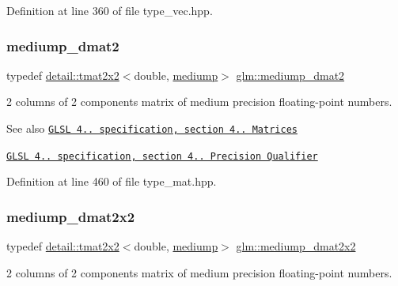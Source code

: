 Definition at line 360 of file type\+\_\+vec.\+hpp.

\mbox{\label{group__core__precision_gac056ec9d1c37e591172544088163b7e4}} 
\subsubsection{\texorpdfstring{mediump\+\_\+dmat2}{mediump\_dmat2}}
{\footnotesize\ttfamily typedef \hyperlink{structglm_1_1detail_1_1tmat2x2}{detail\+::tmat2x2}$<$double, \hyperlink{namespaceglm_a0f04f086094c747d227af4425893f545a6416f3ea0c9025fb21ed50c4d6620482}{mediump}$>$ \hyperlink{group__core__precision_gac056ec9d1c37e591172544088163b7e4}{glm\+::mediump\+\_\+dmat2}}

2 columns of 2 components matrix of medium precision floating-\/point numbers.

\begin{DoxySeeAlso}{See also}
\href{http://www.opengl.org/registry/doc/GLSLangSpec.4.20.8.pdf}{\tt G\+L\+SL 4.. specification, section 4.. Matrices} 

\href{http://www.opengl.org/registry/doc/GLSLangSpec.4.20.8.pdf}{\tt G\+L\+SL 4.. specification, section 4.. Precision Qualifier} 
\end{DoxySeeAlso}


Definition at line 460 of file type\+\_\+mat.\+hpp.

\mbox{\label{group__core__precision_ga88ddb4188060ab00fee67c9840f4417e}} 
\subsubsection{\texorpdfstring{mediump\+\_\+dmat2x2}{mediump\_dmat2x2}}
{\footnotesize\ttfamily typedef \hyperlink{structglm_1_1detail_1_1tmat2x2}{detail\+::tmat2x2}$<$double, \hyperlink{namespaceglm_a0f04f086094c747d227af4425893f545a6416f3ea0c9025fb21ed50c4d6620482}{mediump}$>$ \hyperlink{group__core__precision_ga88ddb4188060ab00fee67c9840f4417e}{glm\+::mediump\+\_\+dmat2x2}}

2 columns of 2 components matrix of medium precision floating-\/point numbers.

